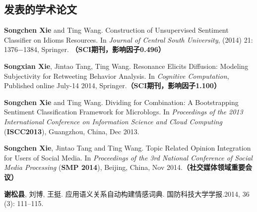 \begin{resume}

  \section*{发表的学术论文} %

  \begin{enumerate}[{[}1{]}]
  \addtolength{\itemsep}{-.36\baselineskip}%
  
  \item \textbf{Songchen Xie} and Ting Wang. Construction of Unsupervised Sentiment Classifier on Idioms Resources. In {\it Journal of Central South University}, (2014) 21: 1376−1384, Springer. \textbf{（SCI期刊，影响因子0.496）}
 
 \item \textbf{Songxian Xie}, Jintao Tang, Ting Wang. Resonance Elicits Diffusion: Modeling Subjectivity for Retweeting Behavior Analysis. In {\it Cognitive Computation}, Published online July-14 2014, Springer.\textbf{（SCI期刊，影响因子1.100）}

 \item \textbf{Songchen Xie} and Ting Wang. Dividing for Combination: A Bootstrapping Sentiment Classification Framework for Microblogs. In {\it Proceedings of the 2013 International Conference on Information Science and Cloud Computing} (\textbf{ISCC2013}), Guangzhou, China, Dec 2013.
 
 \item  \textbf{Songchen Xie}, Jintao Tang and Ting Wang. Topic Related Opinion Integration for Users of Social Media. In {\it Proceedings of the 3rd National Conference of Social Media Processing} (\textbf{SMP 2014}), Beijing, China, Nov 2014.\textbf{（社交媒体领域重要会议）}

\item \textbf{谢松县}, 刘博, 王挺. 应用语义关系自动构建情感词典. 国防科技大学学报.2014, 36 (3): 111–115.

  \end{enumerate}

\end{resume}
